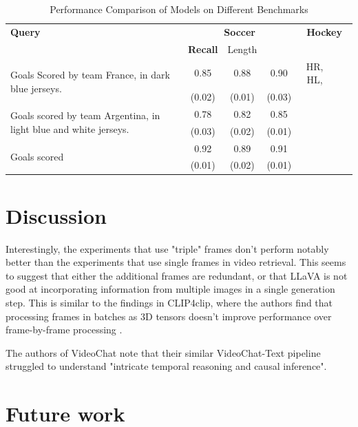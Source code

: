 \documentclass{article}
\begin{document}
\begin{table}[htbp]
  \centering
  \begin{tabular}{lccccc}
    \toprule
    \textbf{Query} & \multicolumn{3}{c}{\textbf{Soccer}} & \multicolumn{3}{c}{\textbf{Hockey}}\\
    \cmidrule(lr){2-4}
    & \textbf{Recall} & Length \\
    \midrule
    \multirow{2}{*}{Goals Scored by team France, in dark blue jerseys.} & 0.85 & 0.88 & 0.90 & HR, HL, \\
    & (0.02) & (0.01) & (0.03) \\
    \midrule
    \multirow{2}{*}{Goals scored by team Argentina, in light blue and white jerseys.} & 0.78 & 0.82 & 0.85 \\
    & (0.03) & (0.02) & (0.01) \\
    \midrule
    \multirow{2}{*}{Goals scored} & 0.92 & 0.89 & 0.91 \\
    & (0.01) & (0.02) & (0.01) \\
    \bottomrule
  \end{tabular}
  \label{tab:video_summarization}
  \caption{Performance Comparison of Models on Different Benchmarks}
\end{table}

\section{Discussion}

Interestingly, the experiments that use "triple" frames don't perform notably better than the experiments that use single frames in video retrieval.
This seems to suggest that either the additional frames are redundant, or that LLaVA is not good at incorporating information from multiple images in a single generation step.
This is similar to the findings in CLIP4clip, where the authors find that processing frames in batches as 3D tensors doesn't improve performance over frame-by-frame processing \cite{clip4clip}.

The authors of VideoChat note that their similar VideoChat-Text pipeline struggled to understand "intricate temporal reasoning and causal inference".

\section{Future work}
\end{document}
